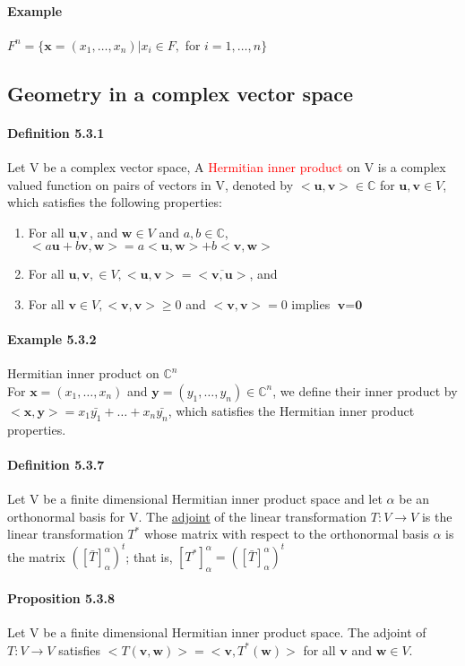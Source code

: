 \documentclass[11pt]{article}
\newcommand{\tb}[1]{\textbf{#1}}
\newcommand{\under}[1]{\underline{#1}}
\newcommand{\mc}[0]{\mathbb{C}}
\newcommand{\vx}[0]{\tb{x}}
\newcommand{\vy}[0]{\tb{y}}
\newcommand{\vo}[0]{\tb{0}}
\newcommand{\vu}[0]{\tb{u}}
\newcommand{\vw}[0]{\tb{w}}
\newcommand{\vv}[0]{\tb{v}}
\begin{document}
{\paragraph{Example} $F^n = \{\vx = (x_1, \hdots, x_n) | x_i\in F,$ for $i = 1,\hdots,n\}$

\subsection{Geometry in a complex vector space}
\paragraph{Definition 5.3.1} Let V be a complex vector space, A \textcolor{red}{Hermitian inner product} on V is a complex valued function on pairs of vectors in V, denoted by $<\vu, \vv> \in \mc$ for $\vu, \vv \in V$, which satisfies the following properties:
\begin{enumerate}
	\item For all $\vu, \vv$, and $\vw \in V$ and $a,b\in \mc$, $<a\vu + b\vv, \vw> = a<\vu,\vw> + b<\vv, \vw>$
	\item For all $\vu, \vv, \in V, <\vu, \vv> = \overline{<\vv,\vu>}$, and
	\item For all $\vv \in V, <\vv, \vv> \geq 0$ and $<\vv, \vv> = 0$ implies $\vv = \vo$
\end{enumerate}
\paragraph{Example 5.3.2} Hermitian inner product on $\mc^n$\\
For $\vx = (x_1, \hdots, x_n)$ and $\vy = (y_1, \hdots, y_n) \in \mc^n$, we define their inner product by $<\vx, \vy> = x_1\bar{y_1} + \hdots + x_n\bar{y_n}$, which satisfies the Hermitian inner product properties.
\paragraph{Definition 5.3.7} Let V be a finite dimensional Hermitian inner product space and let $\alpha$ be an orthonormal basis for V. The \under{adjoint} of the linear transformation $T: V \rightarrow V$ is the linear transformation $T^*$ whose matrix with respect to the orthonormal basis $\alpha$ is the matrix $([\bar{T}]_\alpha^\alpha)^t$; that is, $[T^*]_\alpha^\alpha = ([\bar{T}]_\alpha^\alpha)^t$
\paragraph{Proposition 5.3.8} Let V be a finite dimensional Hermitian inner product space. The adjoint of $T: V \rightarrow V$ satisfies $<T(\vv,\vw)> = <\vv, T^*(\vw)>$ for all $\vv$ and $\vw \in V$.
}
\end{document}
